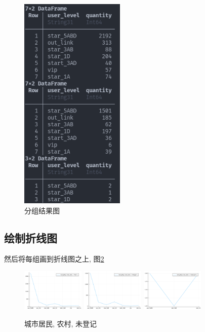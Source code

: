 \documentclass[a4paper]{article}
\begin{document}
\begin{figure}[ht]
 \centering
 \includegraphics[width=5cm]{images/网络分组.png}
 \caption{分组结果图}
 \label{fig:netgroup}
\end{figure}

\subsection{绘制折线图} \label{sub:draw}

然后将每组画到折线图之上, 图\ref{fig:city}
\begin{figure}
    \centering
    \includegraphics[width=3cm]{images/city.png}
    \includegraphics[width=3cm]{images/village.png}
    \includegraphics[width=3cm]{images/unknown.png}
    \caption{城市居民, 农村, 未登记}
    \label{fig:city}
\end{figure}
\end{document}
